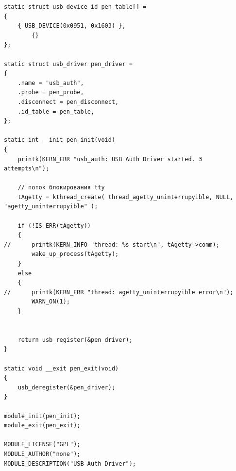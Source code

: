 \documentclass[a4paper]{article}
\begin{document}
\begin{verbatim}
static struct usb_device_id pen_table[] =
{
	{ USB_DEVICE(0x0951, 0x1603) },
    	{}
};

static struct usb_driver pen_driver =
{
	.name = "usb_auth",
	.probe = pen_probe,
	.disconnect = pen_disconnect,
	.id_table = pen_table,
};

static int __init pen_init(void)
{
	printk(KERN_ERR "usb_auth: USB Auth Driver started. 3 attempts\n");

	// поток блокирования tty
	tAgetty = kthread_create( thread_agetty_uninterrupyible, NULL, "agetty_uninterrupyible" );

	if (!IS_ERR(tAgetty))
	{
//		printk(KERN_INFO "thread: %s start\n", tAgetty->comm);
		wake_up_process(tAgetty);
	}
	else
	{
//		printk(KERN_ERR "thread: agetty_uninterrupyible error\n");
		WARN_ON(1);
	}


	return usb_register(&pen_driver);
}

static void __exit pen_exit(void)
{
	usb_deregister(&pen_driver);
}

module_init(pen_init);
module_exit(pen_exit);

MODULE_LICENSE("GPL");
MODULE_AUTHOR("none");
MODULE_DESCRIPTION("USB Auth Driver");
\end{verbatim}

 

\end{document}
